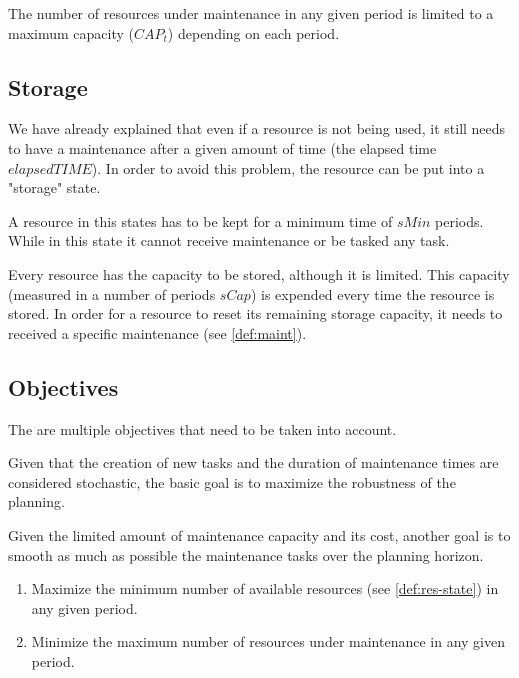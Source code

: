 \documentclass{roadef}
\begin{document}
    The number of resources under maintenance in any given period is limited to a maximum capacity ($CAP_t$) depending on each period.


    \subsection{Storage}
    \label{def:sto}

    We have already explained that even if a resource is not being used, it still needs to have a maintenance after a given amount of time (the elapsed time $elapsedTIME$). In order to avoid this problem, the resource can be put into a "storage" state.

    A resource in this states has to be kept for a minimum time of $sMin$ periods. While in this state it cannot receive maintenance or be tasked any task.

    Every resource has the capacity to be stored, although it is limited. This capacity (measured in a number of periods $sCap$) is expended every time the resource is stored. In order for a resource to reset its remaining storage capacity, it needs to received a specific maintenance (see \ref{def:maint}).

    \subsection{Objectives}
    
    The are multiple objectives that need to be taken into account. 

    Given that the creation of new tasks and the duration of maintenance times are considered stochastic, the basic goal is to maximize the robustness of the planning. 

    Given the limited amount of maintenance capacity and its cost, another goal is to smooth as much as possible the maintenance tasks over the planning horizon.

    \begin{enumerate}
        \item Maximize the minimum number of available resources (see \ref{def:res-state}) in any given period.
        \item Minimize the maximum number of resources under maintenance in any given period.
    \end{enumerate}
\end{document}
